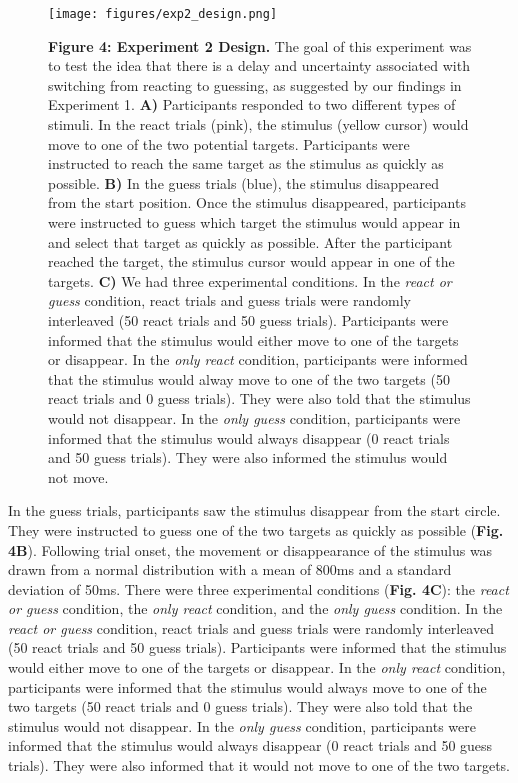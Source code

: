 \documentclass[man,donotrepeattitle,floatsintext,letterpaper,12pt]{apa7}
\newcommand\boldblue[1]{\textcolor{mydarkblue}{\textbf{#1}}}
\begin{document}
\begin{figure}[H]
  \centering
  \texttt{[image: figures/exp2\_design.png]}
  
  \caption*{\boldblue{Figure 4: Experiment 2 Design.} The goal of this experiment was to test the idea that there is a delay and uncertainty associated with switching from reacting to guessing, as suggested by our findings in  Experiment 1. \boldblue{A)} Participants responded to two different types of stimuli. In the react trials (pink), the stimulus (yellow cursor) would move to one of the two potential targets. Participants were instructed to reach the same target as the stimulus as quickly as possible. \boldblue{B)} In the guess trials (blue), the stimulus disappeared from the start position. Once the stimulus disappeared, participants were instructed to guess which target the stimulus would appear in and select that target as quickly as possible. After the participant reached the target, the stimulus cursor would appear in one of the targets. \boldblue{C)} We had three experimental conditions. In the \emph{react or guess} condition, react trials and guess trials were randomly interleaved (50 react trials and 50 guess trials). Participants were informed that the stimulus would either move to one of the targets or disappear. In the \emph{only react} condition, participants were informed that the stimulus would alway move to one of the two targets (50 react trials and 0 guess trials). They were also told that the stimulus would not disappear. In the \emph{only guess} condition, participants were informed that the stimulus would always disappear (0 react trials and 50 guess trials). They were also informed the stimulus would not move. }
\end{figure}

\noindent In the guess trials, participants saw the stimulus disappear from the start circle. They were instructed to guess one of the two targets as quickly as possible (\boldblue{Fig. 4B}). Following trial onset, the movement or disappearance of the stimulus was drawn from a normal distribution with a mean of 800ms and a standard deviation of 50ms. There were three experimental conditions (\boldblue{Fig. 4C}): the \emph{react or guess} condition, the \emph{only react} condition, and the \emph{only guess} condition. In the \emph{react or guess} condition, react trials and guess trials were randomly interleaved (50 react trials and 50 guess trials). Participants were informed that the stimulus would either move to one of the targets or disappear. In the \emph{only react} condition, participants were informed that the stimulus would always move to one of the two targets (50 react trials and 0 guess trials). They were also told that the stimulus would not disappear. In the \emph{only guess} condition, participants were informed that the stimulus would always disappear (0 react trials and 50 guess trials). They were also informed that it would not move to one of the two targets.
\end{document}

